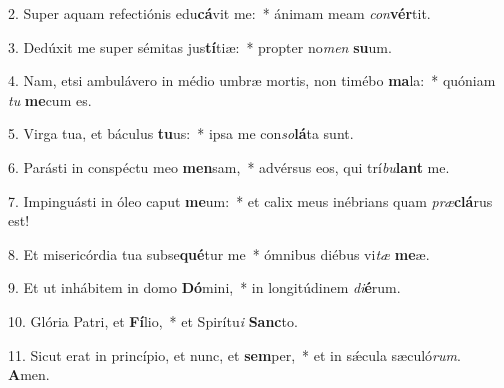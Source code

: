 2. Super aquam refectiónis edu\textbf{cá}vit me:~*  ánimam meam \textit{con}\textbf{vér}tit.\

3. Dedúxit me super sémitas jus\textbf{tí}tiæ:~*  propter no\textit{men} \textbf{su}um.\

4. Nam, etsi ambulávero in médio umbræ mortis, non timébo \textbf{ma}la:~*  quóniam \textit{tu} \textbf{me}cum es.\

5. Virga tua, et báculus \textbf{tu}us:~*  ipsa me con\textit{so}\textbf{lá}ta sunt.\

6. Parásti in conspéctu meo \textbf{men}sam,~*  advérsus eos, qui trí\textit{bu}\textbf{lant} me.\

7. Impinguásti in óleo caput \textbf{me}um:~*  et calix meus inébrians quam \textit{præ}\textbf{clá}rus est!\

8. Et misericórdia tua subse\textbf{qué}tur me~*  ómnibus diébus vi\textit{tæ} \textbf{me}æ.\

9. Et ut inhábitem in domo \textbf{Dó}mini,~*  in longitúdinem \textit{di}\textbf{é}rum.\

10. Glória Patri, et \textbf{Fí}lio,~*  et Spirítu\textit{i} \textbf{Sanc}to.\

11. Sicut erat in princípio, et nunc, et \textbf{sem}per,~*  et in sǽcula sæculó\textit{rum}. \textbf{A}men.\

